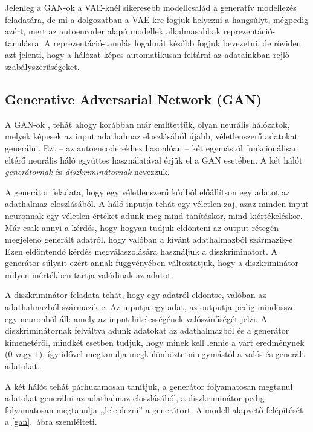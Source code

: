 Jelenleg a GAN-ok a VAE-knél sikeresebb modellcsalád a generatív modellezés feladatára, de mi a dolgozatban a VAE-kre fogjuk helyezni a hangsúlyt, mégpedig azért, mert az autoencoder alapú modellek alkalmasabbak reprezentáció-tanulásra. A reprezentáció-tanulás fogalmát később fogjuk bevezetni, de röviden azt jelenti, hogy a hálózat képes automatikusan feltárni az adatainkban rejlő szabályszerűségeket.

\subsection{Generative Adversarial Network (GAN)}

A GAN-ok \cite{original GAN}, tehát ahogy korábban már említettük, olyan neurális hálózatok, melyek képesek az input adathalmaz eloszlásából újabb, véletlenszerű adatokat generálni. Ezt -- az autoencoderekhez hasonlóan -- két egymástól funkcionálisan eltérő neurális háló együttes használatával érjük el a GAN esetében. A két hálót \textit{generátornak} és \textit{diszkriminátornak} nevezzük.

A generátor feladata, hogy egy véletlenszerű kódból előállítson egy adatot az adathalmaz eloszlásából. A háló inputja tehát egy véletlen zaj, azaz minden input neuronnak egy véletlen értéket adunk meg mind tanításkor, mind kiértékeléskor. Már csak annyi a kérdés, hogy hogyan tudjuk eldönteni az output rétegén megjelenő generált adatról, hogy valóban a kívánt adathalmazból származik-e. Ezen eldöntendő kérdés megválaszolására használjuk a diszkriminátort. A generátor súlyait ezért annak függvényében változtatjuk, hogy a diszkriminátor milyen mértékben tartja valódinak az adatot.

A diszkriminátor feladata tehát, hogy egy adatról eldöntse, valóban az adathalmazból származik-e. Az inputja egy adat, az outputja pedig mindössze egy neuronból áll: amely az input hitelességének valószínűségét jelzi. A diszkriminátornak felváltva adunk adatokat az adathalmazból és a generátor kimenetéről, mindkét esetben tudjuk, hogy minek kell lennie a várt eredménynek ($0$ vagy $1$), így idővel megtanulja megkülönböztetni egymástól a valós és generált adatokat. 

A két hálót tehát párhuzamosan tanítjuk, a generátor folyamatosan megtanul adatokat generálni az adathalmaz eloszlásából, a diszkriminátor pedig folyamatosan megtanulja ,,leleplezni'' a generátort. A modell alapvető felépítését a \ref{gan}.~ábra szemlélteti.

